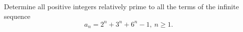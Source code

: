 \begin{problem}
    Determine all positive integers relatively prime to all the terms of the infinite sequence\[ a_n=2^n+3^n+6^n -1,\ n\geq 1. \]

    \label{05IMO4}

\end{problem}